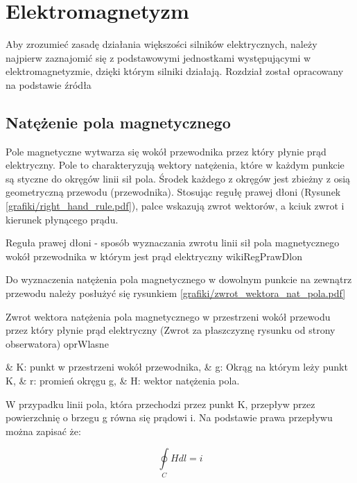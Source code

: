 \section{Elektromagnetyzm}

Aby zrozumieć zasadę działania większości silników elektrycznych, należy najpierw zaznajomić się z podstawowymi jednostkami występującymi w elektromagnetyzmie, dzięki którym silniki działają. Rozdział został opracowany na podstawie źródła \cite{jaszczuk}

\subsection{Natężenie pola magnetycznego}

Pole magnetyczne wytwarza się wokół przewodnika przez który płynie prąd elektryczny. Pole to charakteryzują wektory natężenia, które w każdym punkcie są styczne do okręgów linii sił pola. Środek każdego z okręgów jest zbieżny z osią geometryczną przewodu (przewodnika). Stosując regułę prawej dłoni (Rysunek \ref{grafiki/right_hand_rule.pdf}), palce wskazują zwrot wektorów, a kciuk zwrot i kierunek płynącego prądu.

	   {Reguła prawej dłoni - sposób wyznaczania zwrotu linii sił pola magnetycznego wokół przewodnika w którym jest prąd elektryczny}
	   {wikiRegPrawDlon}
	   
Do wyznaczenia natężenia pola magnetycznego w dowolnym punkcie na zewnątrz przewodu należy posłużyć się rysunkiem \ref{grafiki/zwrot_wektora_nat_pola.pdf}

	   {Zwrot wektora natężenia pola magnetycznego w przestrzeni wokół przewodu przez który płynie prąd elektryczny (Zwrot za płaszczyznę rysunku od strony obserwatora)}
	   {oprWlasne}
	   
\begin{easylist}
	& K: punkt w przestrzeni wokół przewodnika,
	& g: Okrąg na którym leży punkt K,
	& r: promień okręgu g,
	& H: wektor natężenia pola.
	\\
\end{easylist} 

W przypadku linii pola, która przechodzi przez punkt K, przepływ przez powierzchnię o brzegu g równa się prądowi i. Na podstawie prawa przepływu można zapisać że:

\begin{equation} \label{eq:natpol1}
	\oint\limits_C H dl = i
\end{equation}

